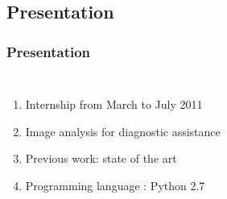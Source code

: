 	\subsection[Presentation]{Presentation}
		\begin{frame}
			\frametitle{Presentation}			
			\begin{columns}[c]
			\column{25em}
				\begin{enumerate}
					\item Internship from March to July 2011
					\item Image analysis for diagnostic assistance
					\item Previous work: state of the art
					\item Programming language : Python 2.7
 				\end{enumerate}	
				\column{5em}
				\vspace{1em}
				\vspace{1em}		

\end{columns}
\end{frame}
